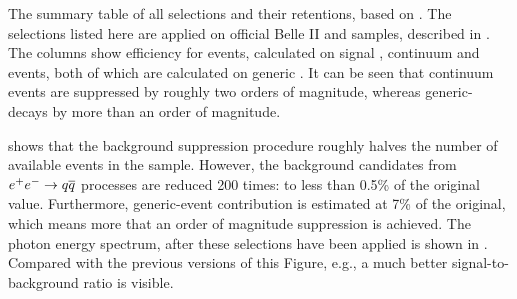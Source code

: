 \begin{table}[htbp!]
    \centering
    \caption{\label{tab:cutflow} The summary table of all selections and their retentions, based on .
    The selections listed here are applied on official Belle II \feiBp and \feiBz samples, described in .
    The columns show efficiency for \BtoXsgamma events, calculated on signal \MC, continuum and \BB events, both of which are calculated on generic \MC.
    It can be seen that continuum events are suppressed by roughly two orders of magnitude, whereas generic-\BB decays by more than an order of magnitude.
    }
    
\end{table}

 shows that the background suppression procedure roughly halves the number of available \BtoXsgamma events in the sample.
However, the background candidates from \mbox{$e^+e^-\rightarrow q\overline q$} processes are reduced 200 times: to less than 0.5\% of the original value.
Furthermore, generic-\BB event contribution is estimated at 7\% of the original, which means more that an order of magnitude suppression is achieved.
The photon energy spectrum, after these selections have been applied is shown in .
Compared with the previous versions of this Figure, e.g., a much better signal-to-background ratio is visible.

